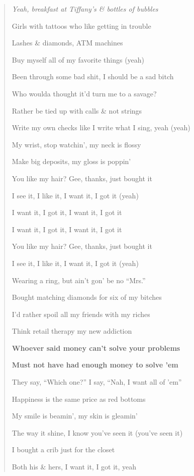 \documentclass{article}
\begin{document}
\begin{enumerate}
	\begin{quotation}\it
		Yeah, breakfast at Tiffany's \& bottles of bubbles
		
		Girls with tattoos who like getting in trouble
		
		Lashes \& diamonds, ATM machines
		
		Buy myself all of my favorite things (yeah)
		
		Been through some bad shit, I should be a sad bitch
		
		Who woulda thought it'd turn me to a savage?
		
		Rather be tied up with calls \& not strings
		
		Write my own checks like I write what I sing, yeah (yeah)
		
		My wrist, stop watchin', my neck is flossy
		
		Make big deposits, my gloss is poppin'
		
		You like my hair? Gee, thanks, just bought it
		
		I see it, I like it, I want it, I got it (yeah)
		
		I want it, I got it, I want it, I got it
		
		I want it, I got it, I want it, I got it
		
		You like my hair? Gee, thanks, just bought it
		
		I see it, I like it, I want it, I got it (yeah)
		
		Wearing a ring, but ain't gon' be no ``Mrs.''
		
		Bought matching diamonds for six of my bitches
		
		I'd rather spoil all my friends with my riches
		
		Think retail therapy my new addiction
		
		\textbf{Whoever said money can't solve your problems}
		
		\textbf{Must not have had enough money to solve 'em}
		
		They say, ``Which one?'' I say, ``Nah, I want all of 'em''
		
		Happiness is the same price as red bottoms
		
		My smile is beamin', my skin is gleamin'
		
		The way it shine, I know you've seen it (you've seen it)
		
		I bought a crib just for the closet
		
		Both his \& hers, I want it, I got it, yeah
		

\end{quotation}
\end{enumerate}
\end{document}
